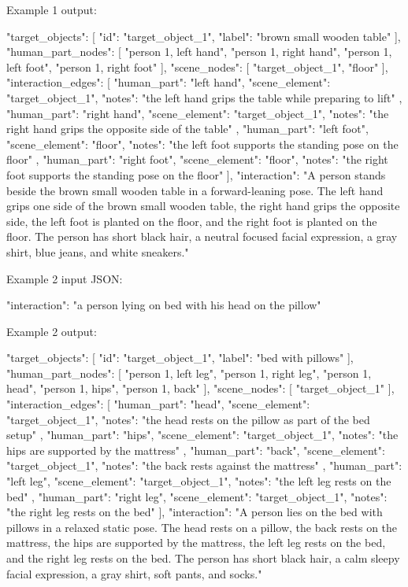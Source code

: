 \begin{promptblock}
Example 1 output:

{
  "target_objects": [
    {
      "id": "target_object_1",
      "label": "brown small wooden table"
    }
  ],
  "human_part_nodes": [
    "person 1, left hand",
    "person 1, right hand",
    "person 1, left foot",
    "person 1, right foot"
  ],
  "scene_nodes": [
    "target_object_1",
    "floor"
  ],
  "interaction_edges": [
    {
      "human_part": "left hand",
      "scene_element": "target_object_1",
      "notes": "the left hand grips the table while preparing to lift"
    },
    {
      "human_part": "right hand",
      "scene_element": "target_object_1",
      "notes": "the right hand grips the opposite side of the table"
    },
    {
      "human_part": "left foot",
      "scene_element": "floor",
      "notes": "the left foot supports the standing pose on the floor"
    },
    {
      "human_part": "right foot",
      "scene_element": "floor",
      "notes": "the right foot supports the standing pose on the floor"
    }
  ],
  "interaction": "A person stands beside the brown small wooden table in a forward-leaning pose. The left hand grips one side of the brown small wooden table, the right hand grips the opposite side, the left foot is planted on the floor, and the right foot is planted on the floor. The person has short black hair, a neutral focused facial expression, a gray shirt, blue jeans, and white sneakers."
}

Example 2 input JSON:

{
  "interaction": "a person lying on bed with his head on the pillow"
}

Example 2 output:

{
  "target_objects": [
    {
      "id": "target_object_1",
      "label": "bed with pillows"
    }
  ],
  "human_part_nodes": [
    "person 1, left leg",
    "person 1, right leg",
    "person 1, head",
    "person 1, hips",
    "person 1, back"
  ],
  "scene_nodes": [
    "target_object_1"
  ],
  "interaction_edges": [
    {
      "human_part": "head",
      "scene_element": "target_object_1",
      "notes": "the head rests on the pillow as part of the bed setup"
    },
    {
      "human_part": "hips",
      "scene_element": "target_object_1",
      "notes": "the hips are supported by the mattress"
    },
    {
      "human_part": "back",
      "scene_element": "target_object_1",
      "notes": "the back rests against the mattress"
    },
    {
      "human_part": "left leg",
      "scene_element": "target_object_1",
      "notes": "the left leg rests on the bed"
    },
    {
      "human_part": "right leg",
      "scene_element": "target_object_1",
      "notes": "the right leg rests on the bed"
    }
  ],
  "interaction": "A person lies on the bed with pillows in a relaxed static pose. The head rests on a pillow, the back rests on the mattress, the hips are supported by the mattress, the left leg rests on the bed, and the right leg rests on the bed. The person has short black hair, a calm sleepy facial expression, a gray shirt, soft pants, and socks."
}


\end{promptblock}
